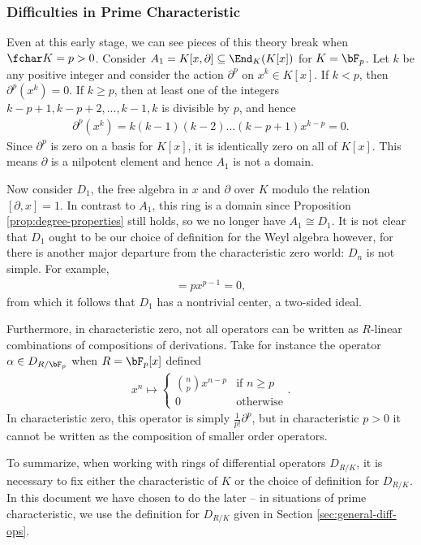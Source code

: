 \subsubsection{Difficulties in Prime Characteristic}
Even at this early stage, we can see pieces of this theory break when $\fchar K = p > 0$. Consider $A_1 = K[x,\partial]\subseteq \End_K(K[x])$ for $K = \bF_p$. Let $k$ be any positive integer and consider the action $\partial^p$ on $x^k \in K[x]$. If $k < p$, then $\partial^p(x^k) = 0$. If $k \geq p$, then at least one of the integers $k-p+1,k-p+2,...,k-1,k$ is divisible by $p$, and hence
\begin{align*}
	\partial^p(x^k) = k(k-1)(k-2)...(k-p+1)x^{k-p} = 0.
\end{align*}
Since $\partial^p$ is zero on a basis for $K[x]$, it is identically zero on all of $K[x]$. This means $\partial$ is a nilpotent element and hence $A_1$ is not a domain.

Now consider $D_1$, the free algebra in $x$ and $\partial$ over $K$ modulo the relation $[\partial, x] = 1$. In contrast to $A_1$, this ring is a domain since Proposition \ref{prop:degree-properties} still holds, so we no longer have $A_1 \cong D_1$. It is not clear that $D_1$ ought to be our choice of definition for the Weyl algebra however, for there is another major departure from the characteristic zero world: $D_n$ is not simple. For example,
\begin{align*}
	[\partial, x^p] = px^{p- 1} = 0,
\end{align*}
from which it follows that $D_1$ has a nontrivial center, a two-sided ideal.

Furthermore, in characteristic zero, not all operators can be written as $R$-linear combinations of compositions of derivations. Take for instance the operator $\alpha \in D_{R/\bF_p}$ when $R = \bF_p[x]$ defined
\begin{align*}
	x^n \mapsto
	\begin{cases}
		\binom{n}{p}x^{n-p} & \text{if } n \geq p \\
		0 & \text{otherwise}
	\end{cases}.
\end{align*}
In characteristic zero, this operator is simply $\frac{1}{p!}\partial^p$, but in characteristic $p > 0$ it cannot be written as the composition of smaller order operators.
\bigskip

To summarize, when working with rings of differential operators $D_{R/K}$, it is necessary to fix either the characteristic of $K$ or the choice of definition for $D_{R/K}$. In this document we have chosen to do the later -- in situations of prime characteristic, we use the definition for $D_{R/K}$ given in Section \ref{sec:general-diff-ops}.

